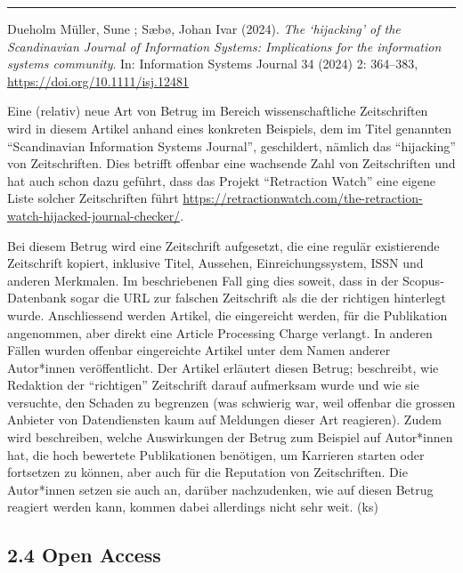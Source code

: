 \documentclass[a4paper,
fontsize=11pt,
oneside,
numbers=noperiodatend,
parskip=half-,
bibliography=totoc,
final
]{scrartcl}
\begin{document}
\begin{center}\rule{0.5\linewidth}{0.5pt}\end{center}

Dueholm Müller, Sune ; Sæbø, Johan Ivar (2024). \emph{The
\enquote*{hijacking} of the Scandinavian Journal of Information Systems:
Implications for the information systems community}. In: Information
Systems Journal 34 (2024) 2: 364--383,
\url{https://doi.org/10.1111/isj.12481}

Eine (relativ) neue Art von Betrug im Bereich wissenschaftliche
Zeitschriften wird in diesem Artikel anhand eines konkreten Beispiels,
dem im Titel genannten \enquote{Scandinavian Information Systems
Journal}, geschildert, nämlich das \enquote{hijacking} von
Zeitschriften. Dies betrifft offenbar eine wachsende Zahl von
Zeitschriften und hat auch schon dazu geführt, dass das Projekt
\enquote{Retraction Watch} eine eigene Liste solcher Zeitschriften führt
\url{https://retractionwatch.com/the-retraction-watch-hijacked-journal-checker/}.

Bei diesem Betrug wird eine Zeitschrift aufgesetzt, die eine regulär
existierende Zeitschrift kopiert, inklusive Titel, Aussehen,
Einreichungssystem, ISSN und anderen Merkmalen. Im beschriebenen Fall
ging dies soweit, dass in der Scopus-Datenbank sogar die URL zur
falschen Zeitschrift als die der richtigen hinterlegt wurde.
Anschliessend werden Artikel, die eingereicht werden, für die
Publikation angenommen, aber direkt eine Article Processing Charge
verlangt. In anderen Fällen wurden offenbar eingereichte Artikel unter
dem Namen anderer Autor*innen veröffentlicht. Der Artikel erläutert
diesen Betrug; beschreibt, wie Redaktion der \enquote{richtigen}
Zeitschrift darauf aufmerksam wurde und wie sie versuchte, den Schaden
zu begrenzen (was schwierig war, weil offenbar die grossen Anbieter von
Datendiensten kaum auf Meldungen dieser Art reagieren). Zudem wird
beschreiben, welche Auswirkungen der Betrug zum Beispiel auf Autor*innen
hat, die hoch bewertete Publikationen benötigen, um Karrieren starten
oder fortsetzen zu können, aber auch für die Reputation von
Zeitschriften. Die Autor*innen setzen sie auch an, darüber nachzudenken,
wie auf diesen Betrug reagiert werden kann, kommen dabei allerdings
nicht sehr weit. (ks)

\hypertarget{open-access}{%
\subsection{2.4 Open Access}\label{open-access}}
\end{document}
